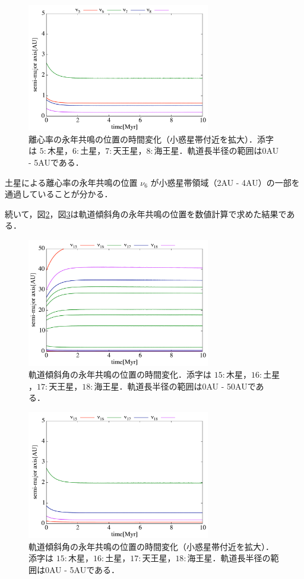 \documentclass[11pt,a4paper,oneside,onecolumn]{jreport}
\begin{document}
\begin{figure}[H]
\centering
\includegraphics[width=8cm]{./image/SecularResonanceAxis_ecc_upto5AU.pdf}
\caption{離心率の永年共鳴の位置の時間変化（小惑星帯付近を拡大）．添字は $5 : 木星$，$6 : 土星$，$7 : 天王星$，$8 : 海王星$．軌道長半径の範囲は0AU - 5AUである．\label{fig:SecularResonanceAxis_ecc_upto5AU}}
\end{figure}

土星による離心率の永年共鳴の位置 $\nu_6$ が小惑星帯領域（2AU - 4AU）の一部を通過していることが分かる．

続いて，図\ref{fig:SecularResonanceAxis_inc}，図\ref{fig:SecularResonanceAxis_inc_upto5AU}は軌道傾斜角の永年共鳴の位置を数値計算で求めた結果である．

\begin{figure}[H]
\centering
\includegraphics[width=8cm]{./image/SecularResonanceAxis_inc.pdf}
\caption{軌道傾斜角の永年共鳴の位置の時間変化．添字は $15 : 木星$，$16 : 土星$，$17 : 天王星$，$18 : 海王星$．軌道長半径の範囲は0AU - 50AUである．\label{fig:SecularResonanceAxis_inc}}
\end{figure}

\begin{figure}[H]
\centering
\includegraphics[width=8cm]{./image/SecularResonanceAxis_inc_upto5AU.pdf}
\caption{軌道傾斜角の永年共鳴の位置の時間変化（小惑星帯付近を拡大）．添字は $15 : 木星$，$16 : 土星$，$17 : 天王星$，$18 : 海王星$．軌道長半径の範囲は0AU - 5AUである．\label{fig:SecularResonanceAxis_inc_upto5AU}}
\end{figure}
\end{document}
